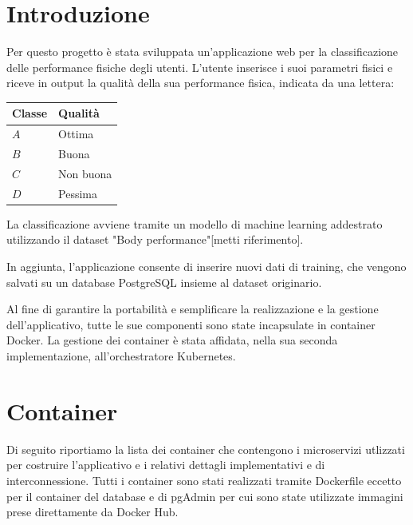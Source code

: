 \documentclass[12pt,a4paper]{report}
\begin{document}


\chapter{Introduzione}

Per questo progetto è stata sviluppata un'applicazione web
per la classificazione delle performance fisiche degli utenti.
L'utente inserisce i suoi parametri fisici e riceve in output
la qualità della sua performance fisica, indicata da una lettera:
\begin{table}[H]
  \centering
  \begin{tabular}{@{}ll@{}}
  \toprule
  \textbf{Classe} & \textbf{Qualità}   \\ \midrule
  $A$      & Ottima    \\
  $B$      & Buona     \\
  $C$      & Non buona \\
  $D$      & Pessima   \\ \bottomrule
  \end{tabular}
\end{table}

La classificazione avviene tramite un modello di machine learning
addestrato utilizzando il dataset "Body performance"[metti riferimento].

In aggiunta, l'applicazione consente di inserire nuovi dati di training,
che vengono salvati su un database PostgreSQL insieme al dataset originario.

Al fine di garantire la portabilità e semplificare
la realizzazione e la gestione dell'applicativo,
tutte le sue componenti sono state incapsulate in container Docker.
La gestione dei container è stata affidata,
nella sua seconda implementazione,
all'orchestratore Kubernetes.

\chapter{Container}

Di seguito riportiamo la lista dei container
che contengono i microservizi utlizzati
per costruire l'applicativo e i relativi dettagli implementativi e di
interconnessione.
Tutti i container sono stati realizzati
tramite Dockerfile eccetto per il container del database e di
pgAdmin per cui sono state utilizzate immagini prese direttamente da
Docker Hub.
\end{document}

